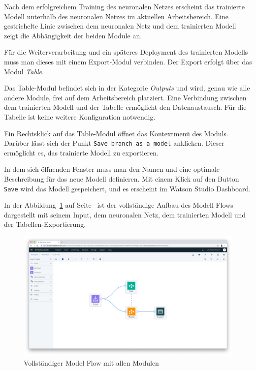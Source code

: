 Nach dem erfolgreichem Training des neuronalen Netzes erscheint das trainierte Modell unterhalb des neuronalen Netzes im
aktuellen Arbeitsbereich. Eine gestrichelte Linie zwischen dem neuronalen Netz und dem trainierten Modell zeigt die
Abhängigkeit der beiden Module an.

Für die Weiterverarbeitung und ein späteres Deployment des trainierten Modells muss man dieses mit einem Export-Modul
verbinden. Der Export erfolgt über das Modul \textit{Table}.

Das Table-Modul befindet sich in der Kategorie \textit{Outputs} und wird, genau wie alle andere Module, frei auf dem
Arbeitsbereich platziert. Eine Verbindung zwischen dem trainierten Modell und der Tabelle ermöglicht den Datenaustausch.
Für die Tabelle ist keine weitere Konfiguration notwendig.

Ein Rechtsklick auf das Table-Modul öffnet das Kontextmenü des Moduls. Darüber lässt sich der Punkt
\texttt{Save branch as a model} anklicken. Dieser ermöglicht es, das trainierte Modell zu exportieren.

In dem sich öffnenden Fenster muss man den Namen und eine optimale Beschreibung für das neue Modell definieren. Mit
einem Klick auf den Button \texttt{Save} wird das Modell gespeichert, und es erscheint im Watson Studio Dashboard.

In der Abbildung~\ref{fig:umsetzung_model_flow} auf Seite~\pageref{fig:umsetzung_model_flow} ist der vollständige Aufbau
des Modell Flows dargestellt mit seinem Input, dem neuronalen Netz, dem trainierten Modell und der
Tabellen-Exportierung.

\begin{figure}[h]
    \centering
    \includegraphics[width=\textwidth]{images/kapitel_3/umsetzung_model_flow.png}
    \caption{Vollständiger Model Flow mit allen Modulen}
    \label{fig:umsetzung_model_flow}
\end{figure}

